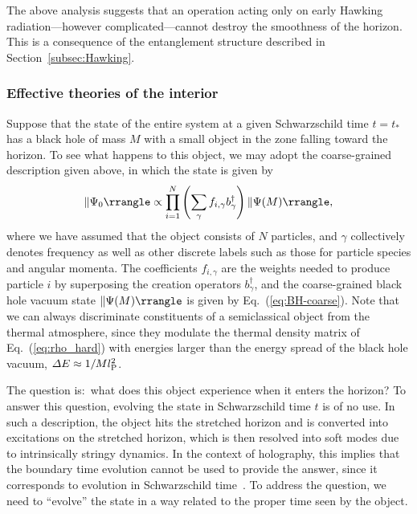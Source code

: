 \documentclass[12pt]{article}
\begin{document}
The above analysis suggests that an operation acting only on 
early Hawking radiation---however complicated---cannot destroy 
the smoothness of the horizon.  This is a consequence of the 
entanglement structure described in Section~\ref{subsec:Hawking}.

\subsubsection{Effective theories of the interior}
\label{subsubsec:inside}

Suppose that the state of the entire system at a given Schwarzschild 
time $t = t_*$ has a black hole of mass $M$ with a small object in 
the zone falling toward the horizon.  To see what happens to this 
object, we may adopt the coarse-grained description given above, 
in which the state is given by
%
\begin{equation}
  \ketc{\Psi_0} \propto \prod_{i=1}^N
    \left( \sum_\gamma f_{i,\gamma} b_\gamma^\dagger \right) 
    \ketc{\Psi(M)},
\label{eq:Psi_0}
\end{equation}
%
where we have assumed that the object consists of $N$ particles, 
and $\gamma$ collectively denotes frequency as well as other 
discrete labels such as those for particle species and angular 
momenta.  The coefficients $f_{i,\gamma}$ are the weights needed 
to produce particle $i$ by superposing the creation operators 
$b_\gamma^\dagger$, and the coarse-grained black hole vacuum state 
$\ketc{\Psi(M)}$ is given by Eq.~(\ref{eq:BH-coarse}).  Note that 
we can always discriminate constituents of a semiclassical object 
from the thermal atmosphere, since they modulate the thermal density 
matrix of Eq.~(\ref{eq:rho_hard}) with energies larger than the 
energy spread of the black hole vacuum, $\varDelta E \approx 
1/Ml_{\rm P}^2$.

The question is:\ what does this object experience when it enters 
the horizon?  To answer this question, evolving the state in 
Schwarzschild time $t$ is of no use.  In such a description, the 
object hits the stretched horizon and is converted into excitations 
on the stretched horizon, which is then resolved into soft modes due 
to intrinsically stringy dynamics.  In the context of holography, 
this implies that the boundary time evolution cannot be used 
to provide the answer, since it corresponds to evolution in 
Schwarzschild time~\cite{Nomura:2018kji}.  To address the question, 
we need to ``evolve'' the state in a way related to the proper 
time seen by the object.
\end{document}
